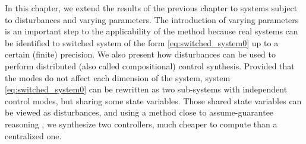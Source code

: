 % 
% 
% 
% 
% 
% 


In this chapter, we extend the results of the previous chapter to 
systems subject to disturbances and varying parameters. 
The introduction of varying parameters is an important step 
to the applicability of the method because real systems 
can be identified to switched system of the form \eqref{eq:switched_system0}
up to a certain (finite) precision. We also present how disturbances can be used to 
perform distributed (also called compositional) control synthesis.
Provided that the modes do not affect each dimension of the system, 
system \eqref{eq:switched_system0} can be rewritten as two sub-systems with independent control modes, 
but sharing some state variables. Those shared state variables 
can be viewed as disturbances, and using a method close to assume-guarantee reasoning \cite{???},
we synthesize two controllers, much cheaper to compute than a centralized one.






